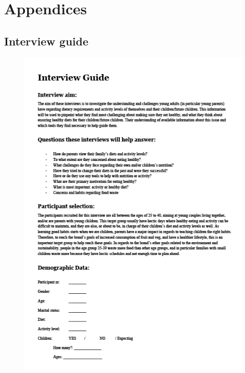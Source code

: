 \chapter{Appendices}

\section{Interview guide}
    \label{interviewguide}
    
    \begin{figure}[H]
        \centering
        \includegraphics[scale=0.8]{figures/Interviewguide1.png}
    \end{figure}

